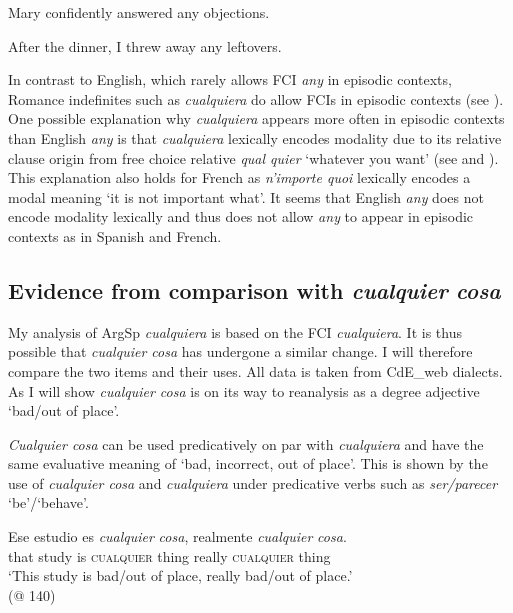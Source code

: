 \ea \label{ex:key:254} %
\ea  Mary confidently answered any objections.

\ex After the dinner, I threw away any leftovers.
    \citep[446]{Dayal1998}
\z
\z 

In contrast to English, which rarely allows FCI \textit{any} in episodic contexts, Romance indefinites such as \textit{cualquiera} do allow FCIs in episodic contexts (see ). One possible explanation why \textit{cualquiera} appears more often in episodic contexts than English \textit{any} is that \textit{cualquiera} lexically encodes modality due to its relative clause origin from free choice relative \textit{qual quier} ‘whatever you want’ (see \citealt{Rivero2011} and ). This explanation also holds for French as \textit{n’importe quoi} lexically encodes a modal meaning ‘it is not important what’. It seems that English \textit{any} does not encode modality lexically and thus does not allow \textit{any} to appear in episodic contexts as in Spanish and French.

\subsection{{Evidence} {from} {comparison} {with} {\textit{cualquier} \textit{cosa}}} \label{sec:4.6.2}

My analysis of ArgSp \textit{cualquiera} is based on the FCI \textit{cualquiera}. It is thus possible that \textit{cualquier cosa} has undergone a similar change. I will therefore compare the two items and their uses. All data is taken from CdE\_web dialects. As I will show \textit{cualquier cosa} is on its way to reanalysis as a degree adjective ‘bad/out of place’.

 \textit{Cualquier cosa} can be used predicatively on par with \textit{cualquiera} and have the same evaluative meaning of ‘bad, incorrect, out of place’. This is shown by the use of \textit{cualquier cosa} and \textit{cualquiera} under predicative verbs such as \textit{ser/parecer} ‘be’/‘behave’.

\ea \label{ex:key:255} %
    \gll Ese estudio es \textit{cualquier} \textit{cosa}, realmente \textit{cualquier} \textit{cosa}.\\
    that study is \textsc{cualquier} thing really \textsc{cualquier} thing\\
    \glt ‘This study is bad/out of place, really bad/out of place.’\\
    (@ 140)
\z

